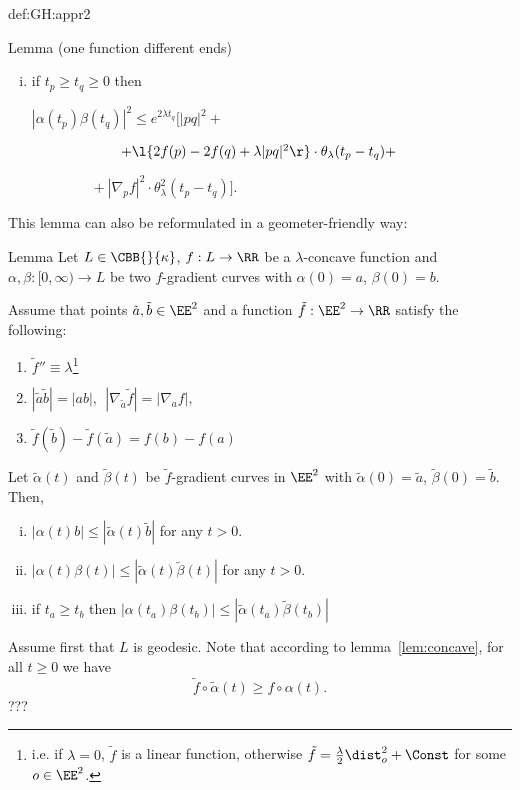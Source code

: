 {\begin{subthm}{def:GH:appr2}
\begin{thm}{Lemma (one function different ends)}
\begin{enumerate}[(i)]
\item \label{two-ends} if $t_p\ge t_q\ge 0$ then

$|\alpha(t_p)\beta(t_q)|^2
\le e^{2\lambda t_q}
\bigl[|p q|^2+ 
 $

$\ \ \ \ \ \ \ \ \ \ \ \ \ \ \ \ \ \ \ +\l\{2f(p)-2f(q)+\lambda|p
q|^2\r\}\cdot\theta_\lambda(t_p-t_q)+$

$\ \ \ \ \ \ \ \ \ \ \ \ \ \ \ \ \ \ \ +|\nabla_p f|^2
\cdot\theta^2_\lambda(t_p-t_q)\bigr].$
\end{enumerate}
\end{thm}



This lemma can also be reformulated in a geometer-friendly way:

\bigskip


\begin{thm}{Lemma}
Let $L\in\CBB{}{\kappa}$, $f:L\to \RR$ be a $\lambda$-concave function  and
$\alpha,\beta:[0,\infty)\to L$ be two $f$-gradient curves with $\alpha(0)=a$,
$\beta(0)=b$. 

Assume that points $\tilde  a, \tilde  b\in \EE^2$ and a function $\tilde  f:\EE^2\to \RR$ satisfy the
following:
\begin{enumerate}[$\diamond$]
\item $\tilde f''\equiv \lambda$\footnote{i.e. if $\lambda=0$, $\tilde  f$ is a linear function, otherwise $\tilde  f=\frac\lambda2\dist^2_{o}+\Const$ for some $o\in \EE^2$.} 
\item $|\tilde  a\tilde  b|=|a b|,\ \ |\nabla_{\tilde  a} \tilde  f|=|\nabla_a f|,$
\item $\tilde  f(\tilde  b)-\tilde  f(\tilde  a)=f(b)-f(a)$
\end{enumerate}
Let $\tilde \alpha(t)$ and $\tilde \beta(t)$ be 
$\tilde  f$-gradient curves in $\EE^2$ with
$\tilde  \alpha(0)=\tilde  a$, $\tilde  \beta(0)=\tilde  b$.
Then,
\begin{enumerate}[(i)]
\item $|\alpha(t)b|\le |\tilde \alpha(t)\tilde  b|$ for any $t>0$.
\item $|\alpha(t)\beta(t)|\le|\tilde \alpha(t)\tilde \beta(t)|$ for any $t>0$.
\item if $t_a\ge t_b$ then $|\alpha(t_a)\beta(t_b)|\le
|\tilde \alpha(t_a)\tilde \beta(t_b)|$
\end{enumerate}
\end{thm}

 Assume first that $L$ is geodesic.
 Note that according to lemma~\ref{lem:concave}, for all $t\ge 0$ we have
$$\tilde f\circ\tilde \alpha(t)\ge f\circ\alpha(t).$$
???



\end{subthm}}

